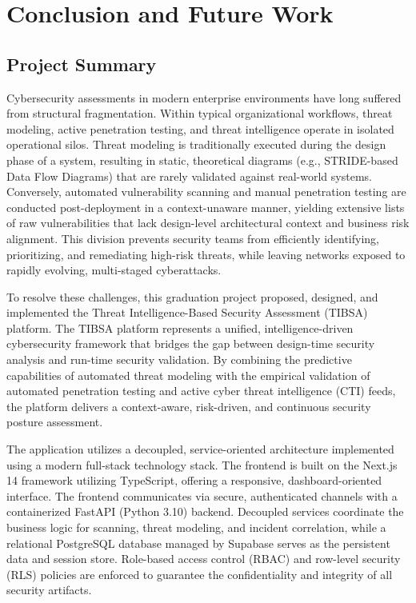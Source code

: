 \chapter{Conclusion and Future Work}
\label{ch:conclusion_future_work}

\section{Project Summary}
\label{sec:ch7_project_summary}

Cybersecurity assessments in modern enterprise environments have long suffered from structural fragmentation. Within typical organizational workflows, threat modeling, active penetration testing, and threat intelligence operate in isolated operational silos. Threat modeling is traditionally executed during the design phase of a system, resulting in static, theoretical diagrams (e.g., STRIDE-based Data Flow Diagrams) that are rarely validated against real-world systems. Conversely, automated vulnerability scanning and manual penetration testing are conducted post-deployment in a context-unaware manner, yielding extensive lists of raw vulnerabilities that lack design-level architectural context and business risk alignment. This division prevents security teams from efficiently identifying, prioritizing, and remediating high-risk threats, while leaving networks exposed to rapidly evolving, multi-staged cyberattacks.

To resolve these challenges, this graduation project proposed, designed, and implemented the Threat Intelligence-Based Security Assessment (TIBSA) platform. The TIBSA platform represents a unified, intelligence-driven cybersecurity framework that bridges the gap between design-time security analysis and run-time security validation. By combining the predictive capabilities of automated threat modeling with the empirical validation of automated penetration testing and active cyber threat intelligence (CTI) feeds, the platform delivers a context-aware, risk-driven, and continuous security posture assessment. 

The application utilizes a decoupled, service-oriented architecture implemented using a modern full-stack technology stack. The frontend is built on the Next.js 14 framework utilizing TypeScript, offering a responsive, dashboard-oriented interface. The frontend communicates via secure, authenticated channels with a containerized FastAPI (Python 3.10) backend. Decoupled services coordinate the business logic for scanning, threat modeling, and incident correlation, while a relational PostgreSQL database managed by Supabase serves as the persistent data and session store. Role-based access control (RBAC) and row-level security (RLS) policies are enforced to guarantee the confidentiality and integrity of all security artifacts.

